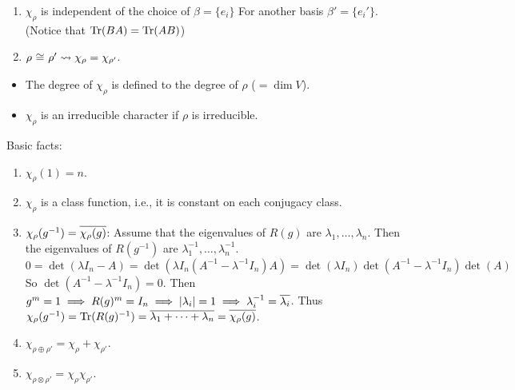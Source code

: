 \begin{remark} \mbox{}
  \begin{enumerate}
    \item $\chi_\rho$ is independent of the choice of $\beta = \{ e_i \}$
      For another basis $\beta' = \{ e_i' \}$.
      (Notice that $\operatorname{Tr}(BA) = \operatorname{Tr}(AB)$)
    \item $\rho \tikz[anchor=base, baseline]{ \node(rho-equiv) {$\cong$}; }
      \rho' \leadsto \chi_\rho = \chi_{\rho'}$.
  \end{enumerate}
\end{remark}

\begin{definition}\mbox{}
  \begin{itemize}
    \item The degree of $\chi_\rho$ is defined to the degree of $\rho$
      ($ =\dim V$).
    \item $\chi_\rho$ is an irreducible character if $\rho$ is irreducible.
  \end{itemize}
\end{definition}

Basic facts:
\begin{enumerate}
  \item $\chi_\rho(1) = n$.
  \item $\chi_\rho$ is a class function, i.e., it is constant on each
    conjugacy class.
  \item $\chi_\rho(g^{-1}) = \overline{\chi_\rho(g)}$: Assume that the eigenvalues
    of $R(g)$ are $\lambda_1, \dots, \lambda_n$. Then the eigenvalues of
    $R(g^{-1})$ are $\lambda_1^{-1}, \dots, \lambda_n^{-1}$.
    \[
      0 = \det(\lambda I_n - A) =
      \det(\lambda I_n (A^{-1} - \lambda^{-1}I_n) A) =
      \det(\lambda I_n) \det(A^{-1} - \lambda^{-1} I_n) \det(A)
    \]
    So $\det(A^{-1} - \lambda^{-1} I_n) = 0$.
    Then $g^m = 1 \implies R(g)^m = I_n \implies \lvert\lambda_i\rvert = 1
    \implies \lambda_i^{-1} = \overline{\lambda_i}$. Thus
    $\chi_\rho(g^{-1}) = \operatorname{Tr}(R(g)^{-1}) =
    \overline{\lambda_1 + \dots + \lambda_n} = \overline{\chi_\rho(g)}$.
  \item $\chi_{\rho \oplus \rho'} = \chi_{\rho} + \chi_{\rho'}$.
  \item $\chi_{\rho \otimes \rho'} = \chi_{\rho} \chi_{\rho'}$.
\end{enumerate}


